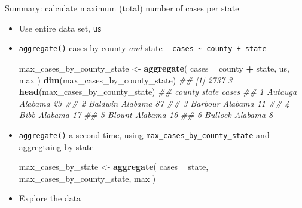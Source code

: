 \documentclass[
]{book}
\newenvironment{Shaded}{\begin{snugshade}}{\end{snugshade}}
\newcommand{\CommentTok}[1]{\textcolor[rgb]{0.56,0.35,0.01}{\textit{#1}}}
\newcommand{\KeywordTok}[1]{\textcolor[rgb]{0.13,0.29,0.53}{\textbf{#1}}}
\newcommand{\NormalTok}[1]{#1}
\newcommand{\OperatorTok}[1]{\textcolor[rgb]{0.81,0.36,0.00}{\textbf{#1}}}
\newcommand{\StringTok}[1]{\textcolor[rgb]{0.31,0.60,0.02}{#1}}
\begin{document}
\begin{itemize}
\begin{Shaded}
\end{Shaded}
\end{itemize}

Summary: calculate maximum (total) number of cases per state

\begin{itemize}
\item
  Use entire data set, \texttt{us}
\item
  \texttt{aggregate()} cases by county \emph{and} state -- \texttt{cases\ \textasciitilde{}\ county\ +\ state}

\begin{Shaded}
\begin{Highlighting}[]
\NormalTok{max_cases_by_county_state <-}
\StringTok{    }\KeywordTok{aggregate}\NormalTok{( cases }\OperatorTok{~}\StringTok{ }\NormalTok{county }\OperatorTok{+}\StringTok{ }\NormalTok{state, us, max )}
\KeywordTok{dim}\NormalTok{(max_cases_by_county_state)}
\CommentTok{## [1] 2737    3}
\KeywordTok{head}\NormalTok{(max_cases_by_county_state)}
\CommentTok{##    county   state cases}
\CommentTok{## 1 Autauga Alabama    23}
\CommentTok{## 2 Baldwin Alabama    87}
\CommentTok{## 3 Barbour Alabama    11}
\CommentTok{## 4    Bibb Alabama    17}
\CommentTok{## 5  Blount Alabama    16}
\CommentTok{## 6 Bullock Alabama     8}
\end{Highlighting}
\end{Shaded}
\item
  \texttt{aggregate()} a second time, using \texttt{max\_cases\_by\_county\_state} and aggregtaing by state

\begin{Shaded}
\begin{Highlighting}[]
\NormalTok{max_cases_by_state <-}
\StringTok{    }\KeywordTok{aggregate}\NormalTok{( cases }\OperatorTok{~}\StringTok{ }\NormalTok{state, max_cases_by_county_state, max )}
\end{Highlighting}
\end{Shaded}
\item
  Explore the data


\end{itemize}
\end{document}
